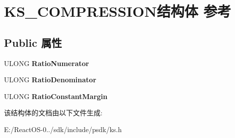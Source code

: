 \hypertarget{struct_k_s___c_o_m_p_r_e_s_s_i_o_n}{}\section{K\+S\+\_\+\+C\+O\+M\+P\+R\+E\+S\+S\+I\+O\+N结构体 参考}
\label{struct_k_s___c_o_m_p_r_e_s_s_i_o_n}
\subsection*{Public 属性}
\begin{DoxyCompactItemize}
\item 
\mbox{\label{struct_k_s___c_o_m_p_r_e_s_s_i_o_n_aa7503a4b4300c8e2aa9c3d78cdbdf4c0}} 
U\+L\+O\+NG {\bfseries Ratio\+Numerator}
\item 
\mbox{\label{struct_k_s___c_o_m_p_r_e_s_s_i_o_n_a29316b7c677bd3593807cf5de26c8234}} 
U\+L\+O\+NG {\bfseries Ratio\+Denominator}
\item 
\mbox{\label{struct_k_s___c_o_m_p_r_e_s_s_i_o_n_a9f56abaadc167710cf2aa86b0165e5c8}} 
U\+L\+O\+NG {\bfseries Ratio\+Constant\+Margin}
\end{DoxyCompactItemize}


该结构体的文档由以下文件生成\+:\begin{DoxyCompactItemize}
\item 
E\+:/\+React\+O\+S-\/0../sdk/include/psdk/ks.\+h\end{DoxyCompactItemize}

